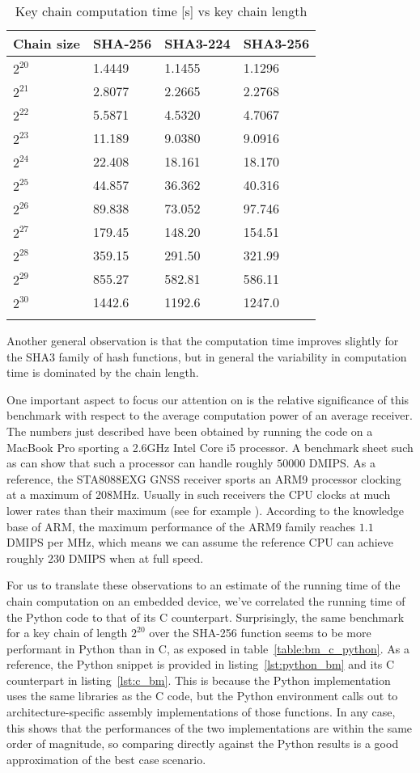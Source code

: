 \begin{longtable}[]{@{}llll@{}}
\toprule
Chain size & SHA-256 & SHA3-224 & SHA3-256\tabularnewline
\midrule
\endhead
$2^{20}$ & 1.4449 & 1.1455 & 1.1296\tabularnewline
$2^{21}$ & 2.8077 & 2.2665 & 2.2768\tabularnewline
$2^{22}$ & 5.5871 & 4.5320 & 4.7067\tabularnewline
$2^{23}$ & 11.189 & 9.0380 & 9.0916\tabularnewline
$2^{24}$ & 22.408 & 18.161 & 18.170\tabularnewline
$2^{25}$ & 44.857 & 36.362 & 40.316\tabularnewline
$2^{26}$ & 89.838 & 73.052 & 97.746\tabularnewline
$2^{27}$ & 179.45 & 148.20 & 154.51\tabularnewline
$2^{28}$ & 359.15 & 291.50 & 321.99\tabularnewline
$2^{29}$ & 855.27 & 582.81 & 586.11\tabularnewline
$2^{30}$ & 1442.6 & 1192.6 & 1247.0\tabularnewline
\bottomrule
\caption{Key chain computation time [s] vs key chain length}
\label{table:bm1}
\end{longtable}

Another general observation is that the computation time improves slightly for
the SHA3 family of hash functions, but in general the variability in computation
time is dominated by the chain length.

One important aspect to focus our attention on is the relative significance of
this benchmark with respect to the average computation power of an average
receiver. The numbers just described have been obtained by running the code on a
MacBook Pro sporting a 2.6GHz Intel Core i5 processor. A benchmark sheet such as
\cite{bm_intel_core_i5} can show that such a processor can handle roughly $50
000$ DMIPS. As a reference, the STA8088EXG GNSS receiver \cite{st_rec_specs}
sports an ARM9 processor clocking at a maximum of 208MHz. Usually in such
receivers the CPU clocks at much lower rates than their maximum (see for example
\cite{mediatek_specs}). According to the knowledge base of ARM, the maximum
performance of the ARM9 family reaches $1.1$ DMIPS per MHz, which means we can
assume the reference CPU can achieve roughly $230$ DMIPS when at full speed.

For us to translate these observations to an estimate of the running time of the
chain computation on an embedded device, we've correlated the running time of
the Python code to that of its C counterpart. Surprisingly, the same benchmark
for a key chain of length $2^{20}$ over the SHA-256 function seems to be more
performant in Python than in C, as exposed in table~\ref{table:bm_c_python}. As a
reference, the Python snippet is provided in listing~\ref{lst:python_bm} and its C
counterpart in listing~\ref{lst:c_bm}. This is because the Python implementation
uses the same libraries as the C code, but the Python environment calls out to
architecture-specific assembly implementations of those functions. In any case,
this shows that the performances of the two implementations are within the same
order of magnitude, so comparing directly against the Python results is a good
approximation of the best case scenario.

